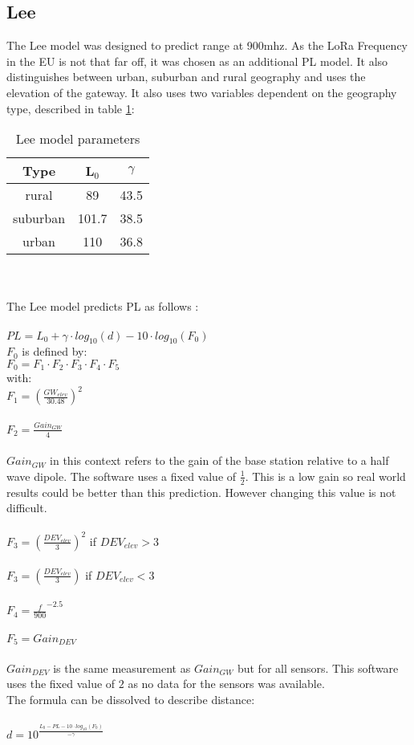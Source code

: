 \documentclass[12pt,a4paper]{article}
\begin{document}
\subsection{Lee}
The Lee model was designed to predict range at 900mhz. As the LoRa Frequency in the EU is not that far off, it was chosen as an additional PL model. It also distinguishes between urban, suburban and rural geography and uses the elevation of the gateway. It also uses two variables dependent on the geography type, described in table \ref{table:lee}:
\begin{table}[!th]
	\centering
	\caption{Lee model parameters}
\begin{tabular}{|c|c|c|}
	\hline
	Type&L$_0$&$\gamma$\\ \hline
	rural&89&43.5\\ \hline
	suburban&101.7&38.5\\ \hline
	urban&110&36.8\\ \hline
\end{tabular}
\label{table:lee}
\end{table}
\\
\\
The Lee model predicts PL as follows \cite{lee}:\\
\\
$PL=L_0 + \gamma \cdot log_{10}(d)-10\cdot log_{10}(F_0)$\\
$F_0$ is defined by:\\
$F_0 = F_1 \cdot F_2 \cdot F_3 \cdot F_4 \cdot F_5$\\
with:\\
$F_1=(\frac{GW_{elev}}{30.48})^2$\\
\\
$F_2=\frac{Gain_{GW}}{4}$\\
\\
$Gain_{GW}$ in this context refers to the gain of the base station relative to a half wave dipole. The software uses a fixed value of $\frac{1}{2}$. This is a low gain so real world results could be better than this prediction. However changing this value is not difficult.\\
\\
$F_3=(\frac{DEV_{elev}}{3})^2$ if $DEV_{elev}>3$\\
\\
$F_3=(\frac{DEV_{elev}}{3})$ if $DEV_{elev}<3$\\
\\
$F_4=\frac{f}{900}^{-2.5}$\\
\\
$F_5=Gain_{DEV}$\\
\\
$Gain_{DEV}$ is the same measurement as $Gain_{GW}$ but for all sensors. This software uses the fixed value of $2$ as no data for the sensors was available.
\\
The formula can be dissolved to describe distance:\\
\\
$d=10^{\frac{L_0-PL-10\cdot log_{10}(F_0)}{-\gamma}}$
\end{document}
